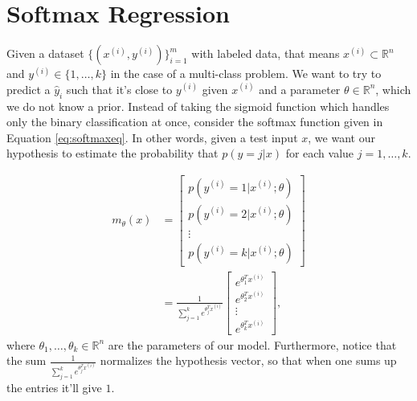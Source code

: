 \documentclass{article}
\begin{document}
\section{Softmax Regression}
  Given a dataset $\{(x^{(i)}, y^{(i)})\}_{i=1}^m$ with labeled data, that means
  $x^{(i)} \subset \mathbb{R}^n$ and $y^{(i)} \in \{1, \dots, k\}$ in the case of a
  multi-class problem. We want to try to predict a $\hat{y}_{i}$ such that it's
  close to $y^{(i)}$ given $x^{(i)}$ and a parameter $\theta \in \mathbb{R}^n$, which
  we do not know a prior. Instead of taking the sigmoid function which handles
  only the binary classification at once, consider the softmax function given
  in Equation \eqref{eq:softmaxeq}. In other words, given a test input $x$,
  we want our hypothesis to estimate the probability that $p(y=j|x)$ for
  each value $j=1,\dots,k$.

  \begin{equation}\label{eq:softmaxeq}
    \begin{split}
      m_{\theta}(x) &=
      \begin{bmatrix}
        p(y^{(i)}=1|x^{(i)}; \theta) \\
        p(y^{(i)}=2|x^{(i)}; \theta) \\
        \vdots                        \\
        p(y^{(i)}=k|x^{(i)}; \theta)
      \end{bmatrix}
      \\ &=
      \frac{1}{\sum_{j=1}^{k}e^{\theta_j^T x^{(i)}}}
      \begin{bmatrix}
        e^{\theta_1^T x^{(i)}} \\
        e^{\theta_2^T x^{(i)}} \\
        \vdots                \\
        e^{\theta_k^T x^{(i)}}
      \end{bmatrix},
    \end{split}
  \end{equation}
  where $\theta_1,\dots,\theta_k \in \mathbb{R}^n$ are the parameters of our model.
  Furthermore, notice that the sum $\frac{1}{\sum_{j=1}^{k}e^{\theta_j^T x^{(i)}}}
  $ normalizes the hypothesis vector, so that when one sums up the entries it'll
  give $1$.
\end{document}
